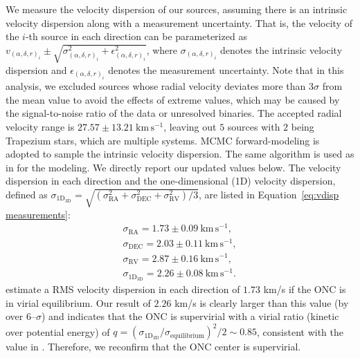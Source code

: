 \documentclass[12pt]{ucsddissertation}
\begin{document}
\begin{CJK*}{UTF8}{gbsn}
We measure the velocity dispersion of our sources, assuming there is an intrinsic velocity dispersion along with a measurement uncertainty. That is, the velocity of the $i$-th source in each direction can be parameterized as $v_{(\alpha, \delta, r)_i} \pm \sqrt{\sigma_{{(\alpha, \delta, r)}_i}^2 + \epsilon_{{(\alpha, \delta, r)}_i}^2}$, where $\sigma_{{(\alpha, \delta, r)}_i}$ denotes the intrinsic velocity dispersion and $\epsilon_{{(\alpha, \delta, r)}_i}$ denotes the measurement uncertainty. Note that in this analysis, we excluded sources whose radial velocity deviates more than $3\sigma$ from the mean value to avoid the effects of extreme values, which may be caused by the signal-to-noise ratio of the data or unresolved binaries. The accepted radial velocity range is $27.57\pm13.21~\mathrm{km}\,\mathrm{s}^{-1}$, leaving out $5$ sources with $2$ being Trapezium stars, which are multiple systems. MCMC forward-modeling is adopted to sample the intrinsic velocity dispersion. The same algorithm is used as in  for the modeling. We directly report our updated values below. The velocity dispersion in each direction and the one-dimensional (1D) velocity dispersion, defined as $\sigma_\mathrm{1D_{3D}}=\sqrt{\left(\sigma_\mathrm{RA}^2 + \sigma_\mathrm{DEC}^2 + \sigma_\mathrm{RV}^2\right)/3}$, are listed in Equation~\ref{eq:vdisp measurements}:
\begin{align} \label{eq:vdisp measurements}
    \sigma_\mathrm{RA} = 1.73 \pm 0.09~\mathrm{km}\,\mathrm{s}^{-1}, \nonumber \\
    \sigma_\mathrm{DEC} = 2.03 \pm 0.11~\mathrm{km}\,\mathrm{s}^{-1}, \nonumber \\
    \sigma_\mathrm{RV} = 2.87 \pm 0.16~\mathrm{km}\,\mathrm{s}^{-1}, \nonumber \\
    \sigma_\mathrm{1D_{3D}} = 2.26 \pm 0.08~\mathrm{km}\,\mathrm{s}^{-1}.
\end{align}
\citet{DaRio-2014} estimate a RMS velocity dispersion in each direction of $1.73$ km/s if the ONC is in virial equilibrium. Our result of $2.26$ km/s is clearly larger than this value (by over $6$--$\sigma$) and indicates that the ONC is supervirial with a virial ratio (kinetic over potential energy) of $q=\left(\sigma_\mathrm{1D_{3D}}/\sigma_\mathrm{equilibrium}\right)^2/2\sim0.85$, consistent with the value in \citet{DaRio-2014}. Therefore, we reconfirm that the ONC center is supervirial.


\end{CJK*}
\end{document}
